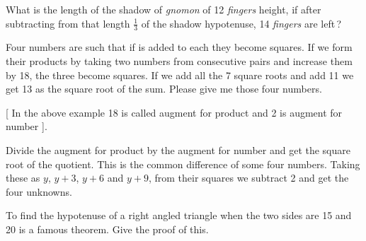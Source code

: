 \documentclass[]{article}
\begin{document}
{{What is the length of the shadow of \textit{gnomon} of 12 \textit{fingers} height, if
after subtracting from that length $\frac{1}{3}$ of the shadow hypotenuse, 14
\textit{fingers} are left\,?}

\begin{quote}  {
}  \end{quote}

{Four \;numbers \;are \;such \;that \;if  \;is \;added \;to \;each \;they become squares.
If we form their products by taking two numbers from consecutive pairs
and increase them by 18, the three become squares. If we add all the 7
square roots and add 11 we get 13 as the square root of the sum. Please
give me those four numbers.}

\begin{quote}  {
}  \end{quote}

[ In the above example 18 is called augment for product and 2 is augment for number ].

Divide the augment for product by the augment for number and get the square root of the quotient. This is the common difference of some four numbers. Taking these as $y$, $y + 3$, $y + 6$ and $y + 9$, from their squares we subtract 2 and get the four unknowns.

\begin{quote}  {
}  \end{quote}

To find the hypotenuse of a right angled triangle when the two sides
are 15 and 20 is a 
\newpage
\large
\noindent famous theorem. Give the proof of this.

\begin{quote}  {
}  \end{quote}

}
\end{document}
